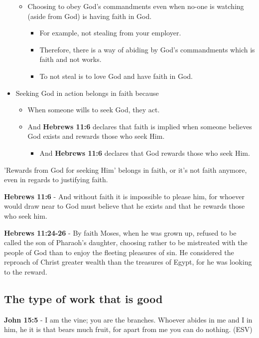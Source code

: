 \documentclass[11pt]{article}
\begin{document}
\begin{itemize}
\begin{itemize}
\item Choosing to obey God's commandments even when no-one is watching (aside from God) is having faith in God.
\begin{itemize}
\item For example, not stealing from your employer.
\item Therefore, there is a way of abiding by God's commandments which is faith and not works.
\item To not steal is to love God and have faith in God.
\end{itemize}
\end{itemize}
\item Seeking God in action belongs in faith because
\begin{itemize}
\item When someone wills to seek God, they act.
\item And \textbf{Hebrews 11:6} declares that faith is implied when someone believes God exists and rewards those who seek Him.
\begin{itemize}
\item And \textbf{Hebrews 11:6} declares that God rewards those who seek Him.
\end{itemize}
\end{itemize}
\end{itemize}

'Rewards from God for seeking Him' belongs in faith, or it's not faith anymore, even in regards to justifying faith.

\textbf{Hebrews 11:6} - And without faith it is impossible to please him, for whoever would draw near to God must believe that he exists and that he rewards those who seek him.

\textbf{Hebrews 11:24-26} - By faith Moses, when he was grown up, refused to be called the son of Pharaoh's daughter, choosing rather to be mistreated with the people of God than to enjoy the fleeting pleasures of sin. He considered the reproach of Christ greater wealth than the treasures of Egypt, for he was looking to the reward.

\subsection{The type of work that is good}
\label{sec:orga5ea2cf}
\textbf{John 15:5} - I am the vine; you are the branches. Whoever abides in me and I in him, he it is that bears much fruit, for apart from me you can do nothing. (ESV)
\end{document}
